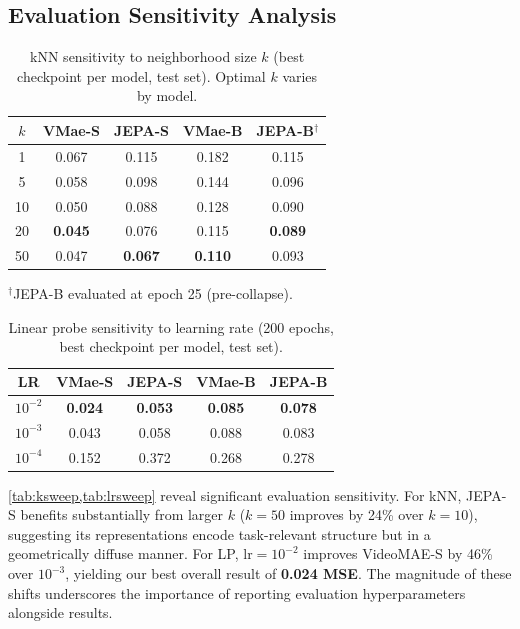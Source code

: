 \documentclass{article}
\begin{document}
\subsection{Evaluation Sensitivity Analysis}

\begin{table}[t]
\caption{kNN sensitivity to neighborhood size $k$ (best checkpoint per model, test set). Optimal $k$ varies by model.}
\label{tab:ksweep}
\vskip 0.1in
\centering
\small
\begin{tabular}{@{}ccccc@{}}
\toprule
$k$ & VMae-S & JEPA-S & VMae-B & JEPA-B$^\dagger$ \\
\midrule
1 & 0.067 & 0.115 & 0.182 & 0.115 \\
5 & 0.058 & 0.098 & 0.144 & 0.096 \\
10 & 0.050 & 0.088 & 0.128 & 0.090 \\
20 & \textbf{0.045} & 0.076 & 0.115 & \textbf{0.089} \\
50 & 0.047 & \textbf{0.067} & \textbf{0.110} & 0.093 \\
\bottomrule
\end{tabular}
\vskip 0.05in
{\raggedright \footnotesize $^\dagger$JEPA-B evaluated at epoch 25 (pre-collapse). \par}
\vskip -0.1in
\end{table}

\begin{table}[t]
\caption{Linear probe sensitivity to learning rate (200 epochs, best checkpoint per model, test set).}
\label{tab:lrsweep}
\vskip 0.1in
\centering
\small
\begin{tabular}{@{}ccccc@{}}
\toprule
LR & VMae-S & JEPA-S & VMae-B & JEPA-B \\
\midrule
$10^{-2}$ & \textbf{0.024} & \textbf{0.053} & \textbf{0.085} & \textbf{0.078} \\
$10^{-3}$ & 0.043 & 0.058 & 0.088 & 0.083 \\
$10^{-4}$ & 0.152 & 0.372 & 0.268 & 0.278 \\
\bottomrule
\end{tabular}
\vskip -0.1in
\end{table}

\cref{tab:ksweep,tab:lrsweep} reveal significant evaluation sensitivity. For kNN, JEPA-S benefits substantially from larger $k$ ($k{=}50$ improves by 24\% over $k{=}10$), suggesting its representations encode task-relevant structure but in a geometrically diffuse manner. For LP, lr$=10^{-2}$ improves VideoMAE-S by 46\% over $10^{-3}$, yielding our best overall result of \textbf{0.024 MSE}. The magnitude of these shifts underscores the importance of reporting evaluation hyperparameters alongside results.
\end{document}
